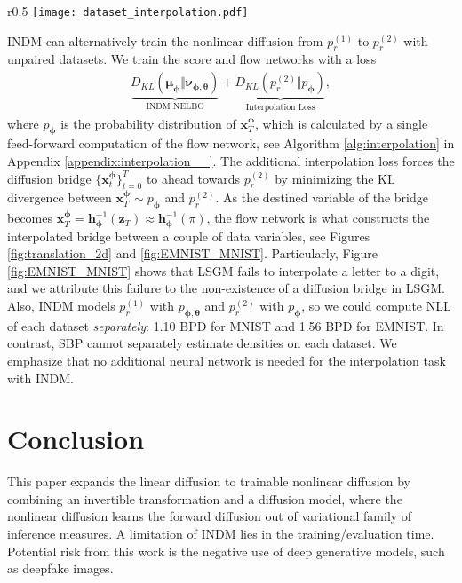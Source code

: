 \documentclass{article}
\theoremstyle{definition}
\theoremstyle{remark}
\begin{document}
	\begin{wrapfigure}{r}{0.5\textwidth}
		\vskip -0.15in
		\centering
		\texttt{[image: dataset\_interpolation.pdf]}
		\vskip -0.05in
		\caption{Image-to-image translation from EMNIST letters dataset to MNIST digits dataset.}
		\label{fig:EMNIST_MNIST}
		\vskip -0.25in
	\end{wrapfigure}
	INDM can alternatively train the nonlinear diffusion from $p_{r}^{(1)}$ to $p_{r}^{(2)}$ with unpaired datasets. We train the score and flow networks with a loss
	\begin{align*}
	\underbrace{D_{KL}(\bm{\mu}_{\bm{\phi}}\Vert\bm{\nu}_{\bm{\phi},\bm{\theta}})}_{\text{INDM NELBO}}+\underbrace{D_{KL}(p_{r}^{(2)}\Vert p_{\bm{\phi}})}_{\text{Interpolation Loss}},
	\end{align*}
	where $p_{\bm{\phi}}$ is the probability distribution of $\mathbf{x}_{T}^{\bm{\phi}}$, which is calculated by a single feed-forward computation of the flow network, see Algorithm \ref{alg:interpolation} in Appendix \ref{appendix:interpolation__}. The additional interpolation loss forces the diffusion bridge $\{\mathbf{x}_{t}^{\bm{\phi}}\}_{t=0}^{T}$ to ahead towards $p_{r}^{(2)}$ by minimizing the KL divergence between $\mathbf{x}_{T}^{\bm{\phi}}\sim p_{\bm{\phi}}$ and $p_{r}^{(2)}$. As the destined variable of the bridge becomes $\mathbf{x}_{T}^{\bm{\phi}}=\mathbf{h}_{\bm{\phi}}^{-1}(\mathbf{z}_{T})\approx\mathbf{h}_{\bm{\phi}}^{-1}(\pi)$, the flow network is what constructs the interpolated bridge between a couple of data variables, see Figures \ref{fig:translation_2d} and \ref{fig:EMNIST_MNIST}. Particularly, Figure \ref{fig:EMNIST_MNIST} shows that LSGM fails to interpolate a letter to a digit, and we attribute this failure to the non-existence of a diffusion bridge in LSGM. Also, INDM models $p_{r}^{(1)}$ with $p_{\bm{\phi},\bm{\theta}}$ and $p_{r}^{(2)}$ with $p_{\bm{\phi}}$, so we could compute NLL of each dataset \textit{separately}: 1.10 BPD for MNIST and 1.56 BPD for EMNIST. In contrast, SBP cannot separately estimate densities on each dataset. We emphasize that no additional neural network is needed for the interpolation task with INDM.
	
	\section{Conclusion}\label{sec:conclusion}
	
	This paper expands the linear diffusion to trainable nonlinear diffusion by combining an invertible transformation and a diffusion model, where the nonlinear diffusion learns the forward diffusion out of variational family of inference measures. A limitation of INDM lies in the training/evaluation time. Potential risk from this work is the negative use of deep generative models, such as deepfake images.
	
\end{document}
